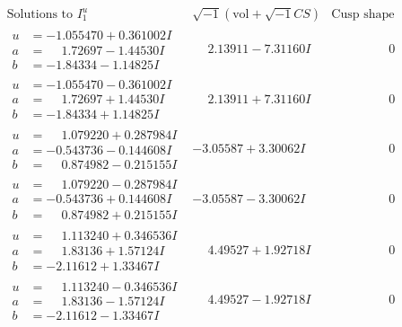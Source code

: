 \documentclass[1p]{elsarticle_modified}
\theoremstyle{definition}
\newcommand{\I}{\sqrt{-1}}
\begin{document}
$$\begin{array}{c|c|c}  
\text{Solutions to }I^u_{1}& \I (\text{vol} + \sqrt{-1}CS) & \text{Cusp shape}\\
 \hline 
\begin{aligned}
u &= -1.055470 + 0.361002 I \\
a &= \phantom{-}1.72697 - 1.44530 I \\
b &= -1.84334 - 1.14825 I\end{aligned}
 & \phantom{-}2.13911 - 7.31160 I & \phantom{-0.000000 } 0 \\ \hline\begin{aligned}
u &= -1.055470 - 0.361002 I \\
a &= \phantom{-}1.72697 + 1.44530 I \\
b &= -1.84334 + 1.14825 I\end{aligned}
 & \phantom{-}2.13911 + 7.31160 I & \phantom{-0.000000 } 0 \\ \hline\begin{aligned}
u &= \phantom{-}1.079220 + 0.287984 I \\
a &= -0.543736 - 0.144608 I \\
b &= \phantom{-}0.874982 - 0.215155 I\end{aligned}
 & -3.05587 + 3.30062 I & \phantom{-0.000000 } 0 \\ \hline\begin{aligned}
u &= \phantom{-}1.079220 - 0.287984 I \\
a &= -0.543736 + 0.144608 I \\
b &= \phantom{-}0.874982 + 0.215155 I\end{aligned}
 & -3.05587 - 3.30062 I & \phantom{-0.000000 } 0 \\ \hline\begin{aligned}
u &= \phantom{-}1.113240 + 0.346536 I \\
a &= \phantom{-}1.83136 + 1.57124 I \\
b &= -2.11612 + 1.33467 I\end{aligned}
 & \phantom{-}4.49527 + 1.92718 I & \phantom{-0.000000 } 0 \\ \hline\begin{aligned}
u &= \phantom{-}1.113240 - 0.346536 I \\
a &= \phantom{-}1.83136 - 1.57124 I \\
b &= -2.11612 - 1.33467 I\end{aligned}
 & \phantom{-}4.49527 - 1.92718 I & \phantom{-0.000000 } 0 \\ \hline\begin{aligned}

\end{aligned}
\end{array}$$
\end{document}

